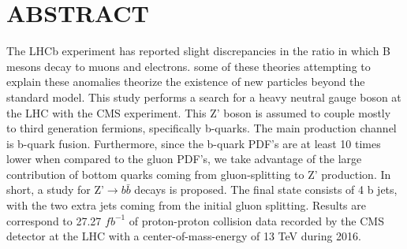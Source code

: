%
%
%
%

\chapter*{ABSTRACT}

\pagestyle{plain} %
\setcounter{page}{2}

\indent The LHCb experiment has reported slight discrepancies in the ratio in which B mesons decay to muons and electrons. some of these theories attempting to explain these anomalies theorize the existence of new particles beyond the standard model. This study performs a search for a heavy neutral gauge boson at the LHC with the CMS experiment. This Z' boson is assumed to couple mostly to third generation fermions, specifically b-quarks. The main production channel is b-quark fusion. Furthermore, since the b-quark PDF's are at least 10 times lower when compared to the gluon PDF's, we take advantage of the large contribution of bottom quarks coming from gluon-splitting to Z' production. In short, a study for Z'$\rightarrow b\bar{b}$ decays is proposed. The final state consists of 4 b jets, with the two extra jets coming from the initial gluon splitting. Results are correspond to 27.27 $fb^{-1}$ of proton-proton collision data recorded by the CMS detector at the LHC with a center-of-mass-energy of 13 TeV during 2016.


 

\pagebreak{}
